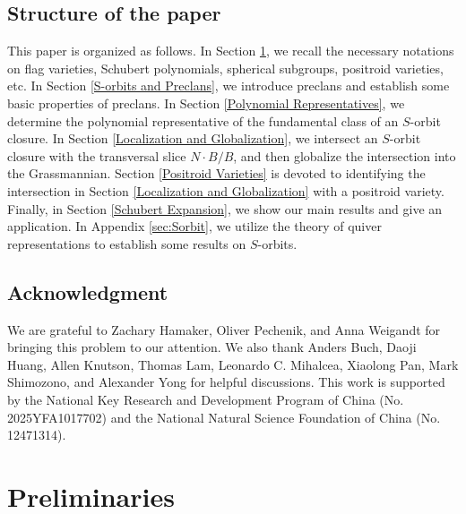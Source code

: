 \documentclass[12pt,reqno]{amsart}
\numberwithin{equation}{section}
\theoremstyle{definition}
\begin{document}
\subsection*{Structure of the paper}
This paper is organized as follows. In Section \ref{Preliminary}, we recall the necessary notations on flag varieties, Schubert polynomials, spherical subgroups, positroid varieties, etc. In Section \ref{S-orbits and Preclans}, we introduce preclans and establish some basic properties of preclans. In Section \ref{Polynomial Representatives}, we determine the polynomial representative of the fundamental class of an $S$-orbit closure. In Section \ref{Localization and Globalization}, we intersect an $S$-orbit closure with the transversal slice $N\cdot B/B$, and then globalize the intersection into the Grassmannian. Section \ref{Positroid Varieties} is devoted to identifying the intersection in Section \ref{Localization and Globalization} with a positroid variety. Finally, in Section \ref{Schubert Expansion}, we show our main results and give an application. In  Appendix \ref{sec:Sorbit}, we utilize the theory of quiver representations to establish some results on $S$-orbits.

\subsection*{Acknowledgment}
We are grateful to Zachary Hamaker, Oliver Pechenik, and Anna Weigandt for bringing this problem to our attention. We also thank Anders Buch, Daoji Huang, Allen Knutson, Thomas Lam,  Leonardo C. Mihalcea, Xiaolong Pan, Mark Shimozono, and Alexander Yong for helpful discussions. This work is supported by the National Key Research and Development Program of China (No. 2025YFA1017702) and the National Natural Science Foundation of China (No. 12471314).






 







\section{Preliminaries}\label{Preliminary}
\end{document}
